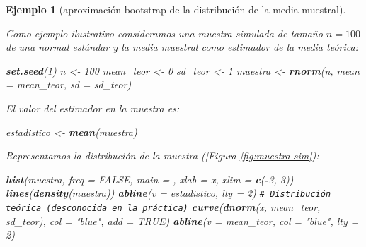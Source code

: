 \documentclass[
  spanish,
  10pt,
]{book}
\newenvironment{Shaded}{\begin{snugshade}}{\end{snugshade}}
\newcommand{\AttributeTok}[1]{\textcolor[rgb]{0.13,0.29,0.53}{#1}}
\newcommand{\CommentTok}[1]{\textcolor[rgb]{0.56,0.35,0.01}{\textit{#1}}}
\newcommand{\ConstantTok}[1]{\textcolor[rgb]{0.56,0.35,0.01}{#1}}
\newcommand{\DecValTok}[1]{\textcolor[rgb]{0.00,0.00,0.81}{#1}}
\newcommand{\FunctionTok}[1]{\textcolor[rgb]{0.13,0.29,0.53}{\textbf{#1}}}
\newcommand{\NormalTok}[1]{#1}
\newcommand{\OtherTok}[1]{\textcolor[rgb]{0.56,0.35,0.01}{#1}}
\newcommand{\SpecialCharTok}[1]{\textcolor[rgb]{0.81,0.36,0.00}{\textbf{#1}}}
\newcommand{\StringTok}[1]{\textcolor[rgb]{0.31,0.60,0.02}{#1}}
\theoremstyle{break}
\newtheorem{example}{Ejemplo}[chapter]
\theoremstyle{nonumberplain}
\renewcommand{\CommentTok}[1]{\textcolor[rgb]{0.41,0.41,0.41}{\texttt{#1}}}
\begin{document}
\begin{example}[aproximación bootstrap de la distribución de la media muestral]
\protect\hypertarget{exm:mean-boot}{}\label{exm:mean-boot}

Como ejemplo ilustrativo consideramos una muestra simulada de tamaño \(n=100\) de una normal estándar y la media muestral como estimador de la media teórica:

\begin{Shaded}
\begin{Highlighting}[]
\FunctionTok{set.seed}\NormalTok{(}\DecValTok{1}\NormalTok{)}
\NormalTok{n }\OtherTok{\textless{}{-}} \DecValTok{100}
\NormalTok{mean\_teor }\OtherTok{\textless{}{-}} \DecValTok{0}
\NormalTok{sd\_teor }\OtherTok{\textless{}{-}} \DecValTok{1}  
\NormalTok{muestra }\OtherTok{\textless{}{-}} \FunctionTok{rnorm}\NormalTok{(n, }\AttributeTok{mean =}\NormalTok{ mean\_teor, }\AttributeTok{sd =}\NormalTok{ sd\_teor)}
\end{Highlighting}
\end{Shaded}

El valor del estimador en la muestra es:

\begin{Shaded}
\begin{Highlighting}[]
\NormalTok{estadistico }\OtherTok{\textless{}{-}} \FunctionTok{mean}\NormalTok{(muestra)}
\end{Highlighting}
\end{Shaded}

Representamos la distribución de la muestra ({[}Figura \ref{fig:muestra-sim}):

\begin{Shaded}
\begin{Highlighting}[]
\FunctionTok{hist}\NormalTok{(muestra, }\AttributeTok{freq =} \ConstantTok{FALSE}\NormalTok{, }\AttributeTok{main =} \StringTok{\textquotesingle{}\textquotesingle{}}\NormalTok{, }\AttributeTok{xlab =} \StringTok{\textquotesingle{}x\textquotesingle{}}\NormalTok{, }\AttributeTok{xlim =} \FunctionTok{c}\NormalTok{(}\SpecialCharTok{{-}}\DecValTok{3}\NormalTok{, }\DecValTok{3}\NormalTok{))}
\FunctionTok{lines}\NormalTok{(}\FunctionTok{density}\NormalTok{(muestra))}
\FunctionTok{abline}\NormalTok{(}\AttributeTok{v =}\NormalTok{ estadistico, }\AttributeTok{lty =} \DecValTok{2}\NormalTok{)}
\CommentTok{\# Distribución teórica (desconocida en la práctica)}
\FunctionTok{curve}\NormalTok{(}\FunctionTok{dnorm}\NormalTok{(x, mean\_teor, sd\_teor), }\AttributeTok{col =} \StringTok{"blue"}\NormalTok{, }\AttributeTok{add =} \ConstantTok{TRUE}\NormalTok{)}
\FunctionTok{abline}\NormalTok{(}\AttributeTok{v =}\NormalTok{ mean\_teor, }\AttributeTok{col =} \StringTok{"blue"}\NormalTok{, }\AttributeTok{lty =} \DecValTok{2}\NormalTok{)}
\end{Highlighting}
\end{Shaded}


\end{example}
\end{document}
